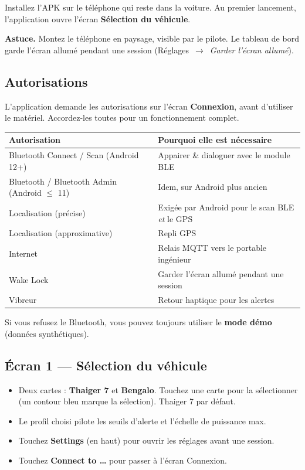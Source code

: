 \documentclass[11pt,a4paper,oneside]{report}
\newcommand{\arrow}{\,$\rightarrow$\,}
\begin{document}
\medskip
Installez l'APK sur le téléphone qui reste dans la voiture. Au premier lancement,
l'application ouvre l'écran \textbf{Sélection du véhicule}.
\begin{tgnote}
\textbf{Astuce.} Montez le téléphone en paysage, visible par le pilote. Le tableau
de bord garde l'écran allumé pendant une session (Réglages \arrow{} \emph{Garder
l'écran allumé}).
\end{tgnote}

\subsection{Autorisations}
L'application demande les autorisations sur l'écran \textbf{Connexion}, avant
d'utiliser le matériel. Accordez-les toutes pour un fonctionnement complet.

\begin{tabularx}{\linewidth}{@{}lL@{}}
\toprule
\textbf{Autorisation} & \textbf{Pourquoi elle est nécessaire}\\
\midrule
Bluetooth Connect / Scan (Android 12+) & Appairer \& dialoguer avec le module BLE\\
Bluetooth / Bluetooth Admin (Android $\le$ 11) & Idem, sur Android plus ancien\\
Localisation (précise) & Exigée par Android pour le scan BLE \emph{et} le GPS\\
Localisation (approximative) & Repli GPS\\
Internet & Relais MQTT vers le portable ingénieur\\
Wake Lock & Garder l'écran allumé pendant une session\\
Vibreur & Retour haptique pour les alertes\\
\bottomrule
\end{tabularx}

\medskip
Si vous refusez le Bluetooth, vous pouvez toujours utiliser le \textbf{mode démo}
(données synthétiques).

\subsection{Écran 1 --- Sélection du véhicule}
\begin{itemize}
  \item Deux cartes : \textbf{Thaiger 7} et \textbf{Bengalo}. Touchez une carte
    pour la sélectionner (un contour bleu marque la sélection). Thaiger 7 par
    défaut.
  \item Le profil choisi pilote les seuils d'alerte et l'échelle de puissance max.
  \item Touchez \textbf{Settings} (en haut) pour ouvrir les réglages avant une
    session.
  \item Touchez \textbf{Connect to \ldots} pour passer à l'écran Connexion.
\end{itemize}
\end{document}
